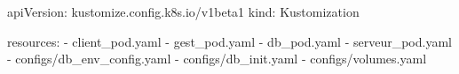 \begin{code}[title=\texttt{arret06/kustomization.yaml}, listing options={language=yaml}]
apiVersion: kustomize.config.k8s.io/v1beta1
kind: Kustomization

resources:
  - client_pod.yaml
  - gest_pod.yaml
  - db_pod.yaml
  - serveur_pod.yaml
  - configs/db_env_config.yaml
  - configs/db_init.yaml
  - configs/volumes.yaml
\end{code}
